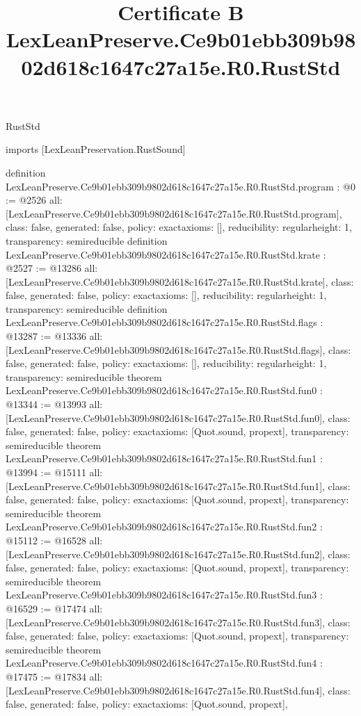 \begin{lexlean}{RustStd}
\title{Certificate B LexLeanPreserve.Ce9b01ebb309b9802d618c1647c27a15e.R0.RustStd}
\begin{coremodule}
imports [LexLeanPreservation.RustSound]

definition LexLeanPreserve.Ce9b01ebb309b9802d618c1647c27a15e.R0.RustStd.program : @0 := @2526 {
  all: [LexLeanPreserve.Ce9b01ebb309b9802d618c1647c27a15e.R0.RustStd.program],
  class: false,
  generated: false,
  policy: exact{axioms: []},
  reducibility: regular{height: 1},
  transparency: semireducible
}
definition LexLeanPreserve.Ce9b01ebb309b9802d618c1647c27a15e.R0.RustStd.krate : @2527 := @13286 {
  all: [LexLeanPreserve.Ce9b01ebb309b9802d618c1647c27a15e.R0.RustStd.krate],
  class: false,
  generated: false,
  policy: exact{axioms: []},
  reducibility: regular{height: 1},
  transparency: semireducible
}
definition LexLeanPreserve.Ce9b01ebb309b9802d618c1647c27a15e.R0.RustStd.flags : @13287 := @13336 {
  all: [LexLeanPreserve.Ce9b01ebb309b9802d618c1647c27a15e.R0.RustStd.flags],
  class: false,
  generated: false,
  policy: exact{axioms: []},
  reducibility: regular{height: 1},
  transparency: semireducible
}
theorem LexLeanPreserve.Ce9b01ebb309b9802d618c1647c27a15e.R0.RustStd.fun0 : @13344 := @13993 {
  all: [LexLeanPreserve.Ce9b01ebb309b9802d618c1647c27a15e.R0.RustStd.fun0],
  class: false,
  generated: false,
  policy: exact{axioms: [Quot.sound, propext]},
  transparency: semireducible
}
theorem LexLeanPreserve.Ce9b01ebb309b9802d618c1647c27a15e.R0.RustStd.fun1 : @13994 := @15111 {
  all: [LexLeanPreserve.Ce9b01ebb309b9802d618c1647c27a15e.R0.RustStd.fun1],
  class: false,
  generated: false,
  policy: exact{axioms: [Quot.sound, propext]},
  transparency: semireducible
}
theorem LexLeanPreserve.Ce9b01ebb309b9802d618c1647c27a15e.R0.RustStd.fun2 : @15112 := @16528 {
  all: [LexLeanPreserve.Ce9b01ebb309b9802d618c1647c27a15e.R0.RustStd.fun2],
  class: false,
  generated: false,
  policy: exact{axioms: [Quot.sound, propext]},
  transparency: semireducible
}
theorem LexLeanPreserve.Ce9b01ebb309b9802d618c1647c27a15e.R0.RustStd.fun3 : @16529 := @17474 {
  all: [LexLeanPreserve.Ce9b01ebb309b9802d618c1647c27a15e.R0.RustStd.fun3],
  class: false,
  generated: false,
  policy: exact{axioms: [Quot.sound, propext]},
  transparency: semireducible
}
theorem LexLeanPreserve.Ce9b01ebb309b9802d618c1647c27a15e.R0.RustStd.fun4 : @17475 := @17834 {
  all: [LexLeanPreserve.Ce9b01ebb309b9802d618c1647c27a15e.R0.RustStd.fun4],
  class: false,
  generated: false,
  policy: exact{axioms: [Quot.sound, propext]},
}
\end{coremodule}
\end{lexlean}
